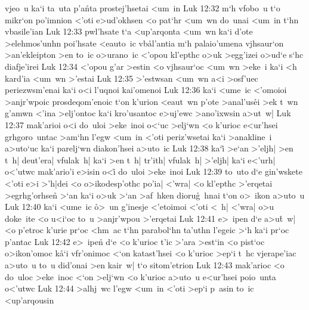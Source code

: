 vjeo~u
ka`i
ta~uta
p'a\r{n}ta
prostej'hsetai
<um~in\bibvsend
\vs Luk 12:32
m`h
vfobo~u
t`o
mikr`on
po'imnion
<'oti
e>ud'okhsen
<o
pat`hr
<um~wn
do~unai
<um~in
t`hn
vbasile'ian\bibvsend
\vs Luk 12:33
pwl'hsate
t`a
<up'arqonta
<um~wn
ka`i
d'ote
>elehmos'unhn
poi'hsate
<eauto~ic
vb\r{a}l'antia
m`h
palaio'umena
vjhsaur`on
>an'ekleipton
>en
to~ic
o>urano~ic
<'opou
kl'epthc
o>uk
>egg'izei
o>ud`e
s`hc
diafje'irei\bibvsend
\vs Luk 12:34
<'opou
g'ar
>estin
<o
vjhsaur`oc
<um~wn
>eke~i
ka`i
<h
kard'ia
<um~wn
>'estai\bibvsend
\vs Luk 12:35
>'estwsan
<um~wn
a<i
>osf'uec
periezwsm'enai
ka`i
o<i
l'uqnoi
kai'omenoi\bibvsend
\vs Luk 12:36
ka`i
<ume~ic
<'omoioi
>anjr'wpoic
prosdeqom'enoic
t`on
k'urion
<eaut~wn
p'ote
>anal'us\r{e}i
>ek
t~wn
g'amwn
<'ina
>elj'ontoc
ka`i
kro'usantoc
e>uj'ewc
>ano'ixwsin
a>ut~w|\bibvsend
\vs Luk 12:37
mak'arioi
o<i
do~uloi
>eke~inoi
o<`uc
>elj`wn
<o
k'urioc
e<ur'hsei
grhgoro~untac
>am`hn
l'egw
<um~in
<'oti
periz'wsetai
ka`i
>anakline~i
a>uto`uc
ka`i
parelj`wn
diakon'hsei
a>uto~ic\bibvsend
\vs Luk 12:38
ka`i\r{}
>e`an
>'eljh|
>en
t~h|
deut'era|
vfulak~h|
ka`i
>en
t~h|
tr'ith|
vfulak~h|
>'eljh|
ka`i
e<'urh|
o<'utwc
mak'ario'i
e>isin
o<i\r{}
do~uloi
>eke~inoi\bibvsend
\vs Luk 12:39
to~uto
d`e
gin'wskete
<'oti
e>i
>'h|dei
<o
o>ikodesp'othc
po'ia|
<'wra|
<o
kl'epthc
>'erqetai
>egrhg'orhsen\r{}
>`an
ka`i
o>uk
>`an
>af~hken
dioru\r{g}~hnai
t`on
o>~ikon
a>uto~u\bibvsend
\vs Luk 12:40
ka`i
<ume~ic
\r{o}>~un
g'inesje
<'etoimoi
<'oti
<~h|
<'wra|
o>u
doke~ite
<o
u<i`oc
to~u
>anjr'wpou
>'erqetai\bibvsend
\vs Luk 12:41
e>~ipen
d`e
a>u\r{t}~w|
<o
p'etroc
k'urie
pr`oc
<hm~ac
t`hn
parabol`hn
ta'uthn
l'egeic
>`h
ka`i
pr`oc
p'antac\bibvsend
\vs Luk 12:42
e>~ipen\r{}
d`e
<o
k'urioc
t'ic
>'ara
>est`in
<o
pist`oc
o>ikon'omoc
k\r{a}`i
vfr'onimoc
<`on
katast'hsei
<o
k'urioc
>ep`i
t~hc
vjerape'iac
a>uto~u
to~u
did'onai
>en
kair~w|
t`o
sitom'etrion\bibvsend
\vs Luk 12:43
mak'arioc
<o
do~uloc
>eke~inoc
<`on
>elj`wn
<o
k'urioc
a>uto~u
e<ur'hsei
poio~unta
o<'utwc\bibvsend
\vs Luk 12:44
>alhj~wc
l'egw
<um~in
<'oti
>ep`i
p~asin
to~ic
<up'arqousin
